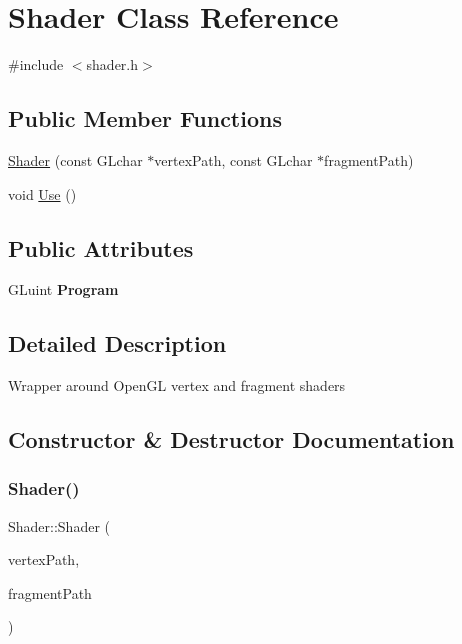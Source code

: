 \hypertarget{classShader}{}\section{Shader Class Reference}
\label{classShader}


{\ttfamily \#include $<$shader.\+h$>$}

\subsection*{Public Member Functions}
\begin{DoxyCompactItemize}
\item 
\hyperlink{classShader_a03421a8419cdad4b84cf58ecdb156879}{Shader} (const G\+Lchar $\ast$vertex\+Path, const G\+Lchar $\ast$fragment\+Path)
\item 
void \hyperlink{classShader_a6b11327cff651ffdb22988b6917b1650}{Use} ()
\end{DoxyCompactItemize}
\subsection*{Public Attributes}
\begin{DoxyCompactItemize}
\item 
\mbox{\label{classShader_a51b23253846bc84dcc2ef06612679012}} 
G\+Luint {\bfseries Program}
\end{DoxyCompactItemize}


\subsection{Detailed Description}
Wrapper around Open\+GL vertex and fragment shaders 

\subsection{Constructor \& Destructor Documentation}
\mbox{\label{classShader_a03421a8419cdad4b84cf58ecdb156879}} 
\subsubsection{\texorpdfstring{Shader()}{Shader()}}
{\footnotesize\ttfamily Shader\+::\+Shader (\begin{DoxyParamCaption}\item[{const G\+Lchar $\ast$}]{vertex\+Path,  }\item[{const G\+Lchar $\ast$}]{fragment\+Path }\end{DoxyParamCaption})}

